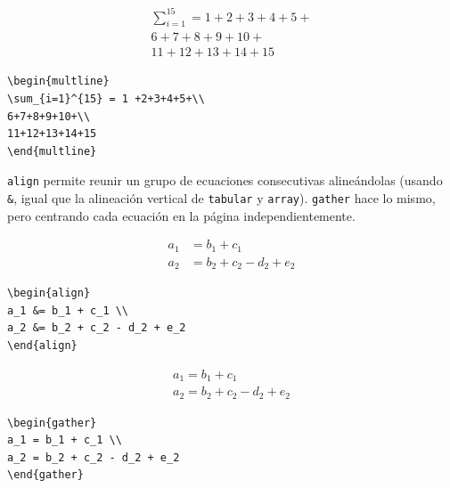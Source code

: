 {\vspace{.3cm}
{\small
\begin{minipage}[c]{7cm}
\begin{multline}
\sum_{i=1}^{15} = 1 +2+3+4+5+\\
6+7+8+9+10+\\
11+12+13+14+15 
\end{multline}
\end{minipage}
\hspace{2cm}
\begin{minipage}[t]{7cm}
\vspace{-1cm}
\begin{verbatim}
\begin{multline}
\sum_{i=1}^{15} = 1 +2+3+4+5+\\
6+7+8+9+10+\\
11+12+13+14+15
\end{multline}
\end{verbatim}
\end{minipage}
}
\vspace{.3cm}

\verb+align+ permite reunir un grupo de ecuaciones
consecutivas aline\'andolas (usando \verb+&+, igual que la
alineaci\'on vertical de \verb+tabular+ y \verb+array+). \verb+gather+
hace lo mismo, pero centrando cada ecuaci\'on en la p\'agina
independientemente. 

\vspace{.3cm}
{\small
\begin{minipage}[c]{7cm}
\begin{align}
a_1 &= b_1 + c_1 \\
a_2 &= b_2 + c_2 - d_2 + e_2
\end{align}
\end{minipage}
\hspace{2cm}
\begin{minipage}[t]{7cm}
\begin{verbatim}
\begin{align}
a_1 &= b_1 + c_1 \\
a_2 &= b_2 + c_2 - d_2 + e_2
\end{align}
\end{verbatim}
\end{minipage}

\begin{minipage}[c]{7cm}
\begin{gather}
a_1 = b_1 + c_1 \\
a_2 = b_2 + c_2 - d_2 + e_2
\end{gather}
\end{minipage}
\hspace{2cm}
\begin{minipage}[t]{7cm}
\begin{verbatim}
\begin{gather}
a_1 = b_1 + c_1 \\
a_2 = b_2 + c_2 - d_2 + e_2
\end{gather}
\end{verbatim}
\end{minipage}
}
\vspace{.3cm}

}
